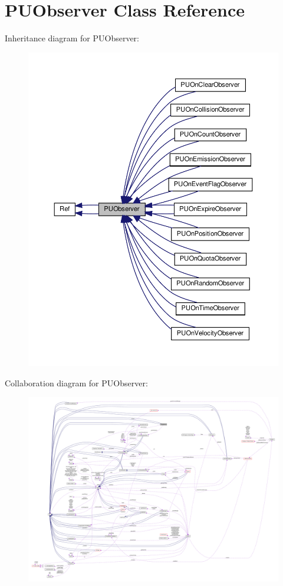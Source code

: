 \hypertarget{classPUObserver}{}\section{P\+U\+Observer Class Reference}
\label{classPUObserver}


Inheritance diagram for P\+U\+Observer\+:
\nopagebreak
\begin{figure}[H]
\begin{center}
\leavevmode
\includegraphics[width=350pt]{classPUObserver__inherit__graph}
\end{center}
\end{figure}


Collaboration diagram for P\+U\+Observer\+:
\nopagebreak
\begin{figure}[H]
\begin{center}
\leavevmode
\includegraphics[width=350pt]{classPUObserver__coll__graph}
\end{center}
\end{figure}
